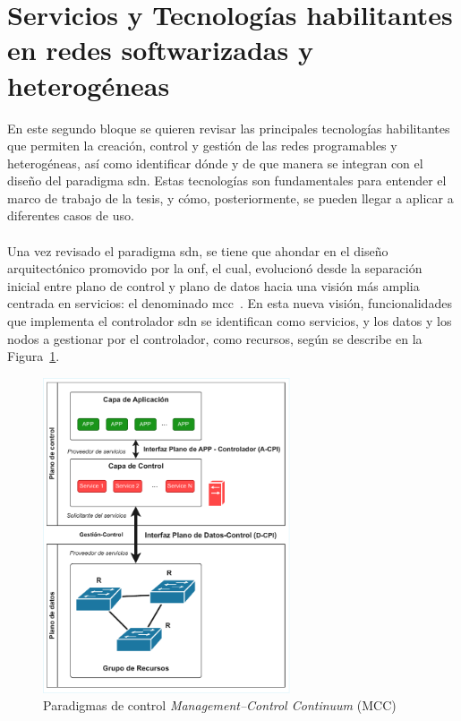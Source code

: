 \section{Servicios y Tecnologías habilitantes en redes softwarizadas y heterogéneas}
\label{sec:tecnologias_habilitantes}

En este segundo bloque se quieren revisar las principales tecnologías habilitantes que permiten la creación, control y gestión de las redes programables y heterogéneas, así como identificar dónde y de que manera se integran con el diseño del paradigma \gls{sdn}. Estas tecnologías son fundamentales para entender el marco de trabajo de la tesis, y cómo, posteriormente, se pueden llegar a aplicar a diferentes casos de uso.\\
\\
Una vez revisado el paradigma \gls{sdn}, se tiene que ahondar en el diseño arquitectónico promovido por la \gls{onf}, el cual, evolucionó desde la separación inicial entre plano de control y plano de datos hacia una visión más amplia centrada en servicios: el denominado \gls{mcc}~\cite{ONF2016}. En esta nueva visión, funcionalidades que implementa el controlador \gls{sdn} se identifican como servicios, y los datos y los nodos a gestionar por el controlador, como recursos, según se describe en la Figura~\ref{fig:sota_6_sdn_arch_mcc}. 

\begin{figure}[ht!]
\centering
\includegraphics[width=0.65\textwidth]{fig/02_sota/sota_6_sdn_arch_mcc.drawio.pdf}
\caption{Paradigmas de control \emph{Management–Control Continuum} (MCC)}
\label{fig:sota_6_sdn_arch_mcc}
\end{figure}

